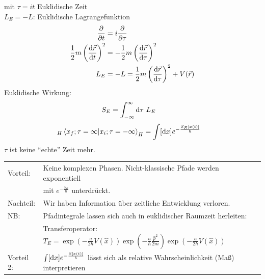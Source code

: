 mit $\tau = i t$ Euklidische Zeit \\
$L_E = -L$: Euklidische Lagrangefunktion
	\begin{align*}
		\frac{\partial}{\partial t} &= i \frac{\partial}{\partial \tau} \\
		\frac{1}{2} m \left(\frac{\mathrm{d} \vec{r}}{\mathrm{d} t}\right)^2 &=
		-\frac{1}{2} m \left(\frac{\mathrm{d} \vec{r}}{\mathrm{d} \tau}\right)^2 \\
		L_E &= - L = \frac{1}{2} m \left(\frac{\mathrm{d} \vec{r}}{\mathrm{d} \tau}\right)^2 + V(\vec{r})
	\end{align*}
Euklidische Wirkung:
	\begin{align*}
		S_E &= \int_{-\infty}^{\infty} \mathrm{d} \tau ~L_E
	\end{align*}
	\begin{align*}
		{}_H\braket{x_f; \tau= \infty | x_i ; \tau= -\infty}_H &= 
		\int [\mathrm{d} x] e^{-\frac{S_E[x(t)]}{\hbar}}
	\end{align*}
$\tau$ ist keine ``echte'' Zeit mehr.\\

	\begin{tabular}{l l}
		Vorteil: & Keine komplexen Phasen. Nicht-klassische Pfade werden exponentiell \\
		 & mit $e^{-\frac{S_E}{\hbar}}$ unterdrückt.\\
		 Nachteil: & Wir haben Information über zeitliche Entwicklung verloren. \\
		 NB: & Pfadintegrale lassen sich auch in euklidischer Raumzeit herleiten:\\
		 & Transferoperator: 
		 $T_E = \exp\left(-\frac{a}{2\hbar} V(\hat{x})\right) \exp\left(-\frac{a}{\hbar} \frac{\hat{p}^2}{2m}\right) \exp\left(-\frac{a}{2\hbar} V(\hat{x})\right)$\\
		 Vorteil 2: & $\int [\mathrm{d} x] e^{-\frac{S[x(t)]}{\hbar}}$ lässt sich als relative Wahrscheinlichkeit (Maß) interpretieren
	\end{tabular}
